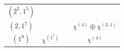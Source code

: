 \documentclass[11pt]{article}
\theoremstyle{definition}
\numberwithin{equation}{section}
\begin{document}
\begin{figure}
\begin{tabular}{|c|c|c|c|}
		&\makecell{$\substack{\chi^{(4)}\oplus 2\chi^{(3,1)} \\ \oplus \chi^{(2^2)}\oplus \chi^{(2,1^2)}}$}\\ \hline
		$(2^2,1^5)$ & \makecell{ $\substack{\chi^{(2^2,1^3)}\\ \oplus \chi^{(2,1^5)} \oplus \chi^{(1^7)}}$} &\makecell{$\substack{ (\chi^{(3)}\boxtimes\chi^{(2,1)} ) \oplus  (\chi^{(2,1)}\boxtimes\chi^{(2,1)}) \\ \oplus  2 (\chi^{(3)}\boxtimes\chi^{(1^3)}) \oplus 2(  \chi^{(2,1)}\boxtimes\chi^{(1^3)}  ) }$}
		&\makecell{$\substack{\chi^{(4)}\\ \oplus 2\chi^{(3,1)}  \oplus \chi^{(2^2)}} $}\\ \hline
		$(2,1^7)$ & \makecell{ $\chi^{(2,1^5)}  \oplus \chi^{(1^7)}$} & 
		\makecell{$\substack{ (\chi^{(3)}\boxtimes\chi^{(2,1)} )  \\ \oplus  (\chi^{(3)}\boxtimes\chi^{(1^3)}) \oplus (  \chi^{(2,1)}\boxtimes\chi^{(1^3)}  ) }$}
		& $\chi^{(4)}\oplus \chi^{(3,1)}$ \\ \hline
		$(1^9)$ & $\chi^{(1^7)}$ &
		\makecell{$\chi^{(3)}\boxtimes \chi^{(1^3)}$}& $\chi^{(4)}$ \\ \hline
	\end{tabular}
\end{figure}


\end{document}

